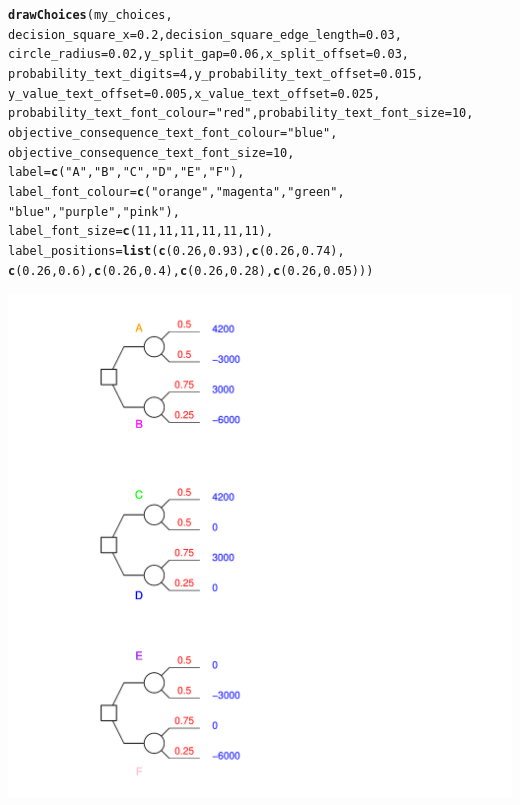 \documentclass{article}\usepackage[]{graphicx}\usepackage[]{color}
\makeatletter
\newcommand{\hlnum}[1]{\textcolor[rgb]{0.686,0.059,0.569}{#1}}%
\newcommand{\hlstr}[1]{\textcolor[rgb]{0.192,0.494,0.8}{#1}}%
\newcommand{\hlstd}[1]{\textcolor[rgb]{0.345,0.345,0.345}{#1}}%
\newcommand{\hlkwc}[1]{\textcolor[rgb]{0.333,0.667,0.333}{#1}}%
\newcommand{\hlkwd}[1]{\textcolor[rgb]{0.737,0.353,0.396}{\textbf{#1}}}%
\newenvironment{kframe}{%
 \def\at@end@of@kframe{}%
 \ifinner\ifhmode%
  \def\at@end@of@kframe{\end{minipage}}%
  \begin{minipage}{\columnwidth}%
 \fi\fi%
 \def\FrameCommand##1{\hskip\@totalleftmargin \hskip-\fboxsep
 \colorbox{shadecolor}{##1}\hskip-\fboxsep
     \hskip-\linewidth \hskip-\@totalleftmargin \hskip\columnwidth}%
 \MakeFramed {\advance\hsize-\width
   \@totalleftmargin\z@ \linewidth\hsize
   \@setminipage}}%
 {\par\unskip\endMakeFramed%
 \at@end@of@kframe}
\newenvironment{knitrout}{}{} %
\makeatother
\begin{document}
\begin{knitrout}
\begin{kframe}
\begin{verbatim}
\end{verbatim}
\begin{alltt}
\hlkwd{drawChoices}\hlstd{(my_choices,}
        \hlkwc{decision_square_x}\hlstd{=}\hlnum{0.2}\hlstd{,} \hlkwc{decision_square_edge_length}\hlstd{=}\hlnum{0.03}\hlstd{,}
        \hlkwc{circle_radius}\hlstd{=}\hlnum{0.02}\hlstd{,} \hlkwc{y_split_gap}\hlstd{=}\hlnum{0.06}\hlstd{,} \hlkwc{x_split_offset}\hlstd{=}\hlnum{0.03}\hlstd{,}
        \hlkwc{probability_text_digits}\hlstd{=}\hlnum{4}\hlstd{,} \hlkwc{y_probability_text_offset}\hlstd{=}\hlnum{0.015}\hlstd{,}
        \hlkwc{y_value_text_offset}\hlstd{=}\hlnum{0.005}\hlstd{,} \hlkwc{x_value_text_offset}\hlstd{=}\hlnum{0.025}\hlstd{,}
        \hlkwc{probability_text_font_colour}\hlstd{=}\hlstr{"red"}\hlstd{,} \hlkwc{probability_text_font_size}\hlstd{=}\hlnum{10}\hlstd{,}
        \hlkwc{objective_consequence_text_font_colour}\hlstd{=}\hlstr{"blue"}\hlstd{,}
        \hlkwc{objective_consequence_text_font_size}\hlstd{=}\hlnum{10}\hlstd{,}
        \hlkwc{label}\hlstd{=}\hlkwd{c}\hlstd{(}\hlstr{"A"}\hlstd{,}\hlstr{"B"}\hlstd{,}\hlstr{"C"}\hlstd{,} \hlstr{"D"}\hlstd{,}\hlstr{"E"}\hlstd{,}\hlstr{"F"}\hlstd{),}
        \hlkwc{label_font_colour}\hlstd{=}\hlkwd{c}\hlstd{(}\hlstr{"orange"}\hlstd{,}\hlstr{"magenta"}\hlstd{,}\hlstr{"green"}\hlstd{,}
                \hlstr{"blue"}\hlstd{,}\hlstr{"purple"}\hlstd{,}\hlstr{"pink"}\hlstd{),}
        \hlkwc{label_font_size}\hlstd{=}\hlkwd{c}\hlstd{(}\hlnum{11}\hlstd{,}\hlnum{11}\hlstd{,}\hlnum{11}\hlstd{,}\hlnum{11}\hlstd{,}\hlnum{11}\hlstd{,}\hlnum{11}\hlstd{),}
        \hlkwc{label_positions}\hlstd{=}\hlkwd{list}\hlstd{(}\hlkwd{c}\hlstd{(}\hlnum{0.26}\hlstd{,}\hlnum{0.93}\hlstd{),}\hlkwd{c}\hlstd{(}\hlnum{0.26}\hlstd{,}\hlnum{0.74}\hlstd{),}
                \hlkwd{c}\hlstd{(}\hlnum{0.26}\hlstd{,}\hlnum{0.6}\hlstd{),}\hlkwd{c}\hlstd{(}\hlnum{0.26}\hlstd{,}\hlnum{0.4}\hlstd{),}\hlkwd{c}\hlstd{(}\hlnum{0.26}\hlstd{,}\hlnum{0.28}\hlstd{),}\hlkwd{c}\hlstd{(}\hlnum{0.26}\hlstd{,}\hlnum{0.05}\hlstd{)))}
\end{alltt}
\end{kframe}

{\centering \includegraphics[width=0.8\linewidth]{figure/unnamed-chunk-43} 

}
\end{knitrout}
\end{document}

